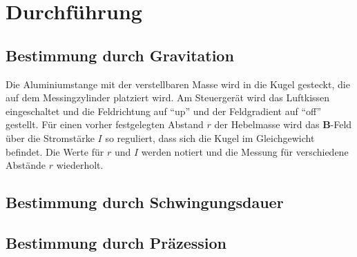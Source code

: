 \section{Durchführung}
\label{sec:Durchführung}
\subsection{Bestimmung durch Gravitation}
Die Aluminiumstange mit der verstellbaren Masse wird in die Kugel gesteckt,
die auf dem Messingzylinder platziert wird.
Am Steuergerät wird das Luftkissen eingeschaltet und die Feldrichtung auf \enquote{up} und
der Feldgradient auf \enquote{off} gestellt.
Für einen vorher festgelegten Abstand $r$ der Hebelmasse wird das $\symbf{B}$-Feld über
die Stromstärke $I$ so reguliert, dass sich die Kugel im Gleichgewicht befindet.
Die Werte für $r$ und $I$ werden notiert und die Messung für verschiedene Abstände $r$ wiederholt. 

\subsection{Bestimmung durch Schwingungsdauer}


\subsection{Bestimmung durch Präzession}
